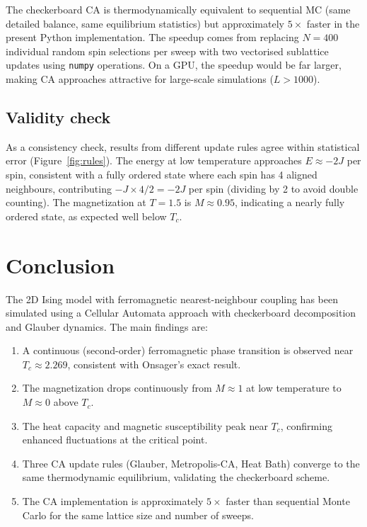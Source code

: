 \documentclass[11pt,a4paper]{article}
\begin{document}
The checkerboard CA is thermodynamically equivalent to sequential MC
(same detailed balance, same equilibrium statistics) but approximately
$5\times$ faster in the present Python implementation. The speedup comes
from replacing $N = 400$ individual random spin selections per sweep with
two vectorised sublattice updates using \texttt{numpy} operations. On a
GPU, the speedup would be far larger, making CA approaches attractive for
large-scale simulations ($L > 1000$).

\subsection{Validity check}

As a consistency check, results from different update rules agree within
statistical error (Figure~\ref{fig:rules}). The energy at low temperature
approaches $E \approx -2J$ per spin, consistent with a fully ordered state
where each spin has 4 aligned neighbours, contributing $-J \times 4/2 = -2J$
per spin (dividing by 2 to avoid double counting). The magnetization at
$T = 1.5$ is $M \approx 0.95$, indicating a nearly fully ordered state, as
expected well below $T_c$.

\section{Conclusion}
\label{sec:conclusion}

The 2D Ising model with ferromagnetic nearest-neighbour coupling has been
simulated using a Cellular Automata approach with checkerboard decomposition
and Glauber dynamics. The main findings are:

\begin{enumerate}[leftmargin=1.5em]
  \item A continuous (second-order) ferromagnetic phase transition is observed
    near $T_c \approx 2.269$, consistent with Onsager's exact result.
  \item The magnetization drops continuously from $M \approx 1$ at low
    temperature to $M \approx 0$ above $T_c$.
  \item The heat capacity and magnetic susceptibility peak near $T_c$,
    confirming enhanced fluctuations at the critical point.
  \item Three CA update rules (Glauber, Metropolis-CA, Heat Bath) converge
    to the same thermodynamic equilibrium, validating the checkerboard scheme.
  \item The CA implementation is approximately $5\times$ faster than sequential
    Monte Carlo for the same lattice size and number of sweeps.
\end{enumerate}
\end{document}
